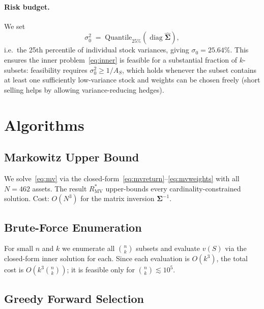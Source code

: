 \documentclass[11pt]{article}
\begin{document}
\paragraph{Risk budget.}
We set
\begin{equation}
  \sigma_0^2 \;=\; \mathrm{Quantile}_{25\%}\!\left(\operatorname{diag}
    \hat{\boldsymbol{\Sigma}}\right),
  \label{eq:riskbudget}
\end{equation}
i.e.\ the 25th percentile of individual stock variances, giving
$\sigma_0 = 25.64\%$.  This ensures the inner problem~\eqref{eq:inner} is
feasible for a substantial fraction of $k$-subsets: feasibility requires
$\sigma_0^2 \geq 1/A_S$, which holds whenever the subset contains at least one
sufficiently low-variance stock and weights can be chosen freely (short selling
helps by allowing variance-reducing hedges).

\section{Algorithms}
\label{sec:algorithms}

\subsection{Markowitz Upper Bound}

We solve~\eqref{eq:mv} via the closed-form~\eqref{eq:mvreturn}--\eqref{eq:mvweights}
with all $N=462$ assets.  The result $R^*_{\text{MV}}$ upper-bounds every
cardinality-constrained solution.  Cost: $O(N^3)$ for the matrix inversion
$\boldsymbol{\Sigma}^{-1}$.

\subsection{Brute-Force Enumeration}

For small $n$ and $k$ we enumerate all $\binom{n}{k}$ subsets and evaluate
$v(S)$ via the closed-form inner solution for each.  Since each evaluation is
$O(k^3)$, the total cost is $O\!\left(k^3\binom{n}{k}\right)$; it is
feasible only for $\binom{n}{k}\lesssim 10^5$.

\subsection{Greedy Forward Selection}
\end{document}
